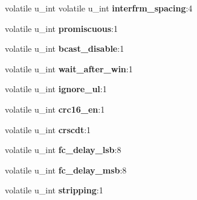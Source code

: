\begin{DoxyCompactItemize}
\item 
\mbox{\label{structfxp__cb__config_a8953a32cea2112873fd9d9b424cbb510}} 
volatile u\+\_\+int volatile u\+\_\+int {\bfseries interfrm\+\_\+spacing}\+:4
\item 
\mbox{\label{structfxp__cb__config_aa31a8d5e3cd2616d40578442fe8d59c0}} 
volatile u\+\_\+int {\bfseries promiscuous}\+:1
\item 
\mbox{\label{structfxp__cb__config_ae63d8beb71b6c81cf3c6c29faafea756}} 
volatile u\+\_\+int {\bfseries bcast\+\_\+disable}\+:1
\item 
\mbox{\label{structfxp__cb__config_aeb46bcc5a9507fa791bf9151517332e2}} 
volatile u\+\_\+int {\bfseries wait\+\_\+after\+\_\+win}\+:1
\item 
\mbox{\label{structfxp__cb__config_a937165d343f3c6e6be4ce9c45dd59dc6}} 
volatile u\+\_\+int {\bfseries ignore\+\_\+ul}\+:1
\item 
\mbox{\label{structfxp__cb__config_a28781983886d1bf7ff231204dab43aed}} 
volatile u\+\_\+int {\bfseries crc16\+\_\+en}\+:1
\item 
\mbox{\label{structfxp__cb__config_ae46a7781ff1f9469308627059ff356de}} 
volatile u\+\_\+int {\bfseries crscdt}\+:1
\item 
\mbox{\label{structfxp__cb__config_a7011081ca6fe6031d82f7fed084c7e16}} 
volatile u\+\_\+int {\bfseries fc\+\_\+delay\+\_\+lsb}\+:8
\item 
\mbox{\label{structfxp__cb__config_a7bed251ac302a0df61896d047ccba0ea}} 
volatile u\+\_\+int {\bfseries fc\+\_\+delay\+\_\+msb}\+:8
\item 
\mbox{\label{structfxp__cb__config_af8a6b741caadec8d643387dc62fb900f}} 
volatile u\+\_\+int {\bfseries stripping}\+:1
\item 
\mbox{\label{structfxp__cb__config_a5367696130700e8e74bfe27a32a2d5f1}} 

\end{DoxyCompactItemize}
